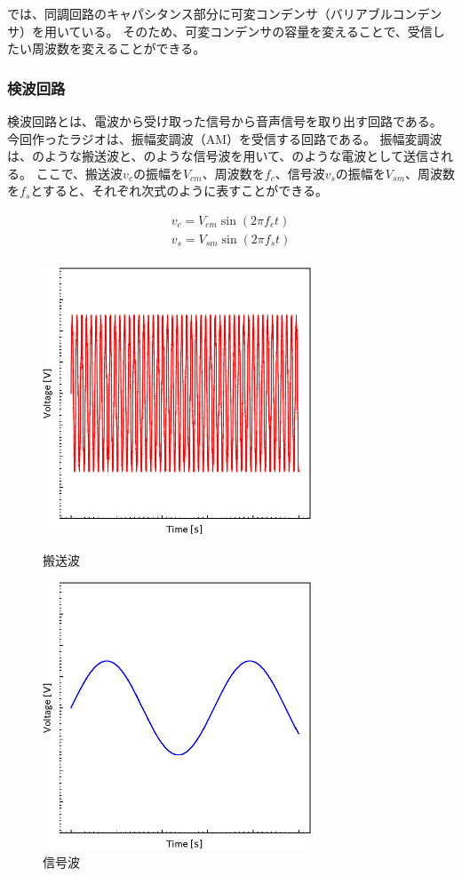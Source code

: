 \documentclass[report.tex]{subfiles}
\begin{document}
では、同調回路のキャパシタンス部分に可変コンデンサ（バリアブルコンデンサ）を用いている。
そのため、可変コンデンサの容量を変えることで、受信したい周波数を変えることができる。

\subsubsection{検波回路}

検波回路とは、電波から受け取った信号から音声信号を取り出す回路である。
今回作ったラジオは、振幅変調波（AM）を受信する回路である。
振幅変調波は、のような搬送波と、のような信号波を用いて、のような電波として送信される。
ここで、搬送波\(v_c\)の振幅を\(V_{cm}\)、周波数を\(f_c\)、信号波\(v_s\)の振幅を\(V_{sm}\)、周波数を\(f_s\)とすると、それぞれ次式のように表すことができる。

\begin{align}
	v_c = V_{cm} \sin(2 \pi f_c t) \\
	v_s = V_{sm} \sin(2 \pi f_s t) \\
\end{align}

\begin{figure}[H]
	\begin{minipage}[b]{0.5\columnwidth}
		\centering
		\includegraphics[width=8cm]{fig/5V.pdf}
		\caption{搬送波}
		\label{fig:5V}
	\end{minipage}
	\begin{minipage}[b]{0.5\columnwidth}
		\centering
		\includegraphics[width=8cm]{fig/3V.pdf}
		\caption{信号波}
		\label{fig:3V}
	\end{minipage}
\end{figure}
\end{document}
